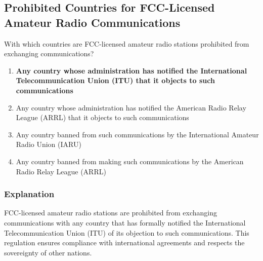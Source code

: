 \subsection{Prohibited Countries for FCC-Licensed Amateur Radio Communications}
\label{T1D01}

\begin{tcolorbox}[colback=gray!10!white,colframe=black!75!black,title=T1D01]
With which countries are FCC-licensed amateur radio stations prohibited from exchanging communications?
\begin{enumerate}[label=\Alph*),noitemsep]
    \item \textbf{Any country whose administration has notified the International Telecommunication Union (ITU) that it objects to such communications}
    \item Any country whose administration has notified the American Radio Relay League (ARRL) that it objects to such communications
    \item Any country banned from such communications by the International Amateur Radio Union (IARU)
    \item Any country banned from making such communications by the American Radio Relay League (ARRL)
\end{enumerate}
\end{tcolorbox}

\subsubsection*{Explanation}
FCC-licensed amateur radio stations are prohibited from exchanging communications with any country that has formally notified the International Telecommunication Union (ITU) of its objection to such communications. This regulation ensures compliance with international agreements and respects the sovereignty of other nations.